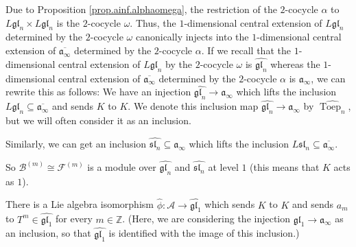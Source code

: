 \documentclass[etingof-lie.tex]{subfiles}
\begin{document}
\begin{definition}
Due to Proposition \ref{prop.ainf.alphaomega}, the restriction of the
$2$-cocycle $\alpha$ to $L\mathfrak{gl}_{n}\times L\mathfrak{gl}_{n}$ is the
$2$-cocycle $\omega$. Thus, the $1$-dimensional central extension of
$L\mathfrak{gl}_{n}$ determined by the $2$-cocycle $\omega$ canonically
injects into the $1$-dimensional central extension of $\overline
{\mathfrak{a}_{\infty}}$ determined by the $2$-cocycle $\alpha$. If we recall
that the $1$-dimensional central extension of $L\mathfrak{gl}_{n}$ by the
$2$-cocycle $\omega$ is $\widehat{\mathfrak{gl}_{n}}$ whereas the
$1$-dimensional central extension of $\overline{\mathfrak{a}_{\infty}}$
determined by the $2$-cocycle $\alpha$ is $\mathfrak{a}_{\infty}$, we can
rewrite this as follows: We have an injection $\widehat{\mathfrak{gl}_{n}%
}\rightarrow\mathfrak{a}_{\infty}$ which lifts the inclusion $L\mathfrak{gl}%
_{n}\subseteq\overline{\mathfrak{a}_{\infty}}$ and sends $K$ to $K$. We denote
this inclusion map $\widehat{\mathfrak{gl}_{n}}\rightarrow\mathfrak{a}%
_{\infty}$ by $\widehat{\operatorname*{Toep}\nolimits_{n}}$, but we will often
consider it as an inclusion.

Similarly, we can get an inclusion $\widehat{\mathfrak{sl}_{n}}\subseteq
\mathfrak{a}_{\infty}$ which lifts the inclusion $L\mathfrak{sl}_{n}%
\subseteq\overline{\mathfrak{a}_{\infty}}$.

So $\mathcal{B}^{\left(  m\right)  }\cong\mathcal{F}^{\left(  m\right)  }$ is
a module over $\widehat{\mathfrak{gl}_{n}}$ and $\widehat{\mathfrak{sl}_{n}}$
at level $1$ (this means that $K$ acts as $1$).
\end{definition}

\begin{corollary}
\label{cor.glnhat.div}There is a Lie algebra isomorphism $\widehat{\phi
}:\mathcal{A}\rightarrow\widehat{\mathfrak{gl}_{1}}$ which sends $K$ to $K$
and sends $a_{m}$ to $T^{m}\in\widehat{\mathfrak{gl}_{1}}$ for every
$m\in\mathbb{Z}$. (Here, we are considering the injection
$\widehat{\mathfrak{gl}_{1}}\rightarrow\mathfrak{a}_{\infty}$ as an inclusion,
so that $\widehat{\mathfrak{gl}_{1}}$ is identified with the image of this inclusion.)
\end{corollary}
\end{document}
